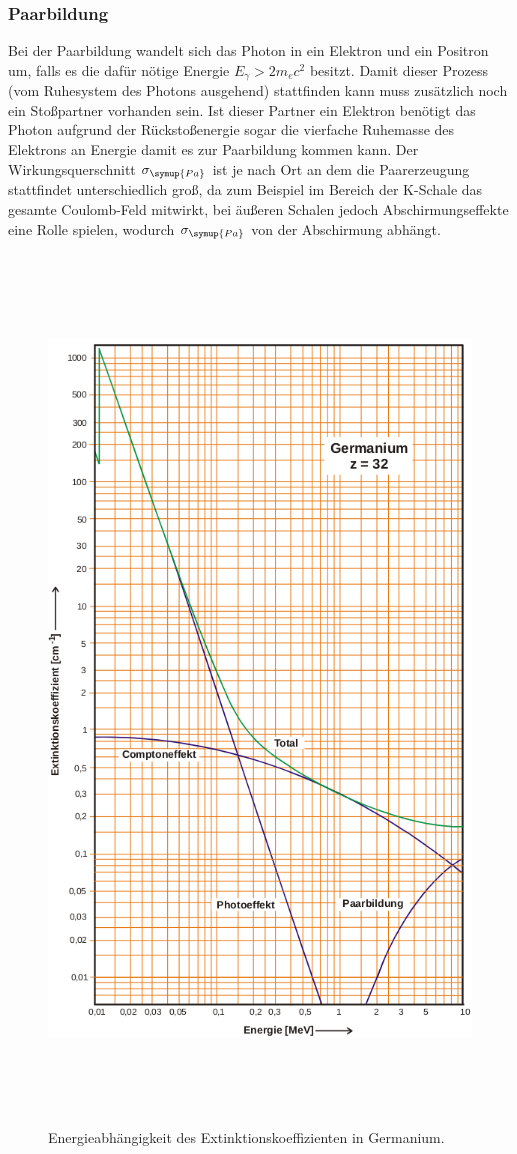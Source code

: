 \subsubsection{Paarbildung}
Bei der Paarbildung wandelt sich das Photon in ein Elektron und ein Positron um, falls es die dafür nötige Energie $E_{\gamma}>2m_ec^2$ besitzt.
Damit dieser Prozess (vom Ruhesystem des Photons ausgehend) stattfinden kann muss zusätzlich noch ein Stoßpartner vorhanden sein.
Ist dieser Partner ein Elektron benötigt das Photon aufgrund der Rückstoßenergie sogar die vierfache Ruhemasse des Elektrons an Energie damit es zur Paarbildung kommen kann.
Der Wirkungsquerschnitt $\sigma_{\symup{Pa}}$ ist je nach Ort an dem die Paarerzeugung stattfindet unterschiedlich groß, da zum Beispiel im Bereich der K-Schale das gesamte Coulomb-Feld mitwirkt, bei äußeren Schalen jedoch Abschirmungseffekte eine Rolle spielen, wodurch $\sigma_{\symup{Pa}}$ von der Abschirmung abhängt.

 \begin{figure}
   \centering
   \includegraphics[height=23cm]{content/Germanium.png}
   \caption{Energieabhängigkeit des Extinktionskoeffizienten in Germanium.\cite{V18}}
   \label{fig:Germanium}
 \end{figure}
